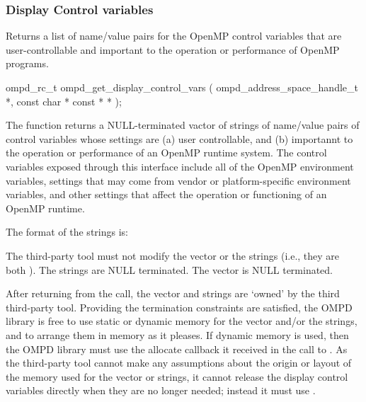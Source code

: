 \subsubsection{Display Control variables}

\label{subsubsubsec:ompd_get_display_control_vars}
\summary
Returns a list of name/value pairs for the OpenMP control variables
that are user-controllable and important to the operation or
performance of OpenMP programs.
\format
\begin{cspecific}
\begin{ompSyntax}
ompd_rc_t ompd_get_display_control_vars (
  ompd_address_space_handle_t *,
  const char * const * *
);
\end{ompSyntax}
\end{cspecific}

\descr
The function  returns a
NULL-terminated vactor of strings of name/value pairs of control
variables whose settings are (a) user controllable,
and (b) importannt to the operation or performance of an OpenMP
runtime system.
The control variables exposed through this interface include all
of the OpenMP environment variables, settings that may come from
vendor or platform-specific environment variables, and other
settings that affect the operation or functioning of an OpenMP
runtime.

The format of the strings is:
\begin{center}
\end{center}

The third-party tool must not modify the vector or the strings
(i.e., they are both ).
The strings are NULL terminated.
The vector is NULL terminated.

After returning from the call, the vector and strings are `owned'
by the third third-party tool.
Providing the termination constraints are satisfied, the OMPD library
is free to use static or dynamic memory for the
vector and/or the strings, and to arrange them in memory
as it pleases.
If dynamic memory is used, then the OMPD library must use
the allocate callback it received in the call to .
As the third-party tool cannot make any assumptions about the origin or
layout of the memory used for the vector or strings, it cannot release
the display control variables directly when they are no longer
needed; instead it must use .

